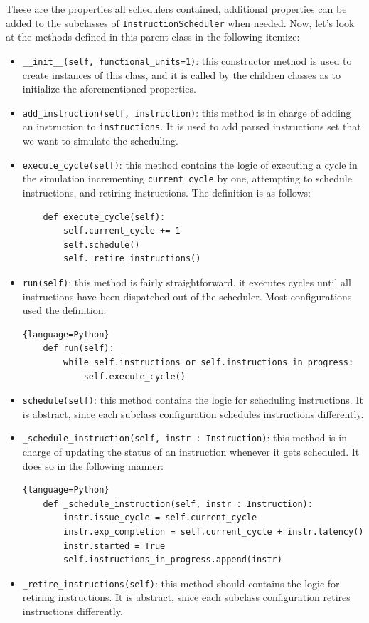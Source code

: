 \documentclass{article}
\begin{document}
These are the properties all schedulers contained, additional properties can be added to the subclasses of \lstinline|InstructionScheduler| when needed. Now, let's look at the methods defined in this parent class in the following itemize:
\begin{itemize}
    \item \lstinline|__init__(self, functional_units=1)|: this constructor method is used to create instances of this class, and it is called by the children classes as to initialize the aforementioned properties. 
    \item \lstinline|add_instruction(self, instruction)|: this method is in charge of adding an instruction to \lstinline|instructions|. It is used to add parsed instructions set that we want to simulate the scheduling.
    \item \lstinline|execute_cycle(self)|: this method contains the logic of executing a cycle in the simulation incrementing \lstinline|current_cycle| by one, attempting to schedule instructions, and retiring instructions. The definition is as follows:
    \begin{lstlisting}
    def execute_cycle(self):
        self.current_cycle += 1
        self.schedule()
        self._retire_instructions()
    \end{lstlisting}
    \item \lstinline|run(self)|: this method is fairly straightforward, it executes cycles until all instructions have been dispatched out of the scheduler. Most configurations used the definition:
    \begin{lstlisting}{language=Python}
    def run(self):
        while self.instructions or self.instructions_in_progress:
            self.execute_cycle()
    \end{lstlisting}
    \item \lstinline|schedule(self)|: this method contains the logic for scheduling instructions. It is abstract, since each subclass configuration schedules instructions differently. 
    \item \lstinline|_schedule_instruction(self, instr : Instruction)|: this method is in charge of updating the status of an instruction whenever it gets scheduled. It does so in the following manner:
    \begin{lstlisting}{language=Python}
    def _schedule_instruction(self, instr : Instruction):
        instr.issue_cycle = self.current_cycle
        instr.exp_completion = self.current_cycle + instr.latency()
        instr.started = True 
        self.instructions_in_progress.append(instr)
    \end{lstlisting}
    \item \lstinline{_retire_instructions(self)}: this method should contains the logic for retiring instructions. It is abstract, since each subclass configuration retires instructions differently.
\end{itemize}
\end{document}
